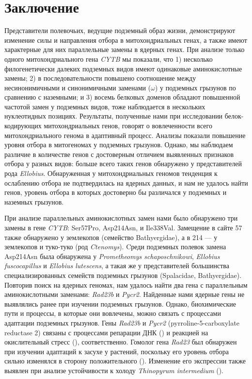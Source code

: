 
\chapter{Заключение} 

Представители полевочьих, ведущие подземный образ жизни, демонстрируют изменение силы и направления отбора в митохондриальных генах, а также имеют характерные для них параллельные замены в ядерных генах. При анализе только одного митохондриального гена \textit{CYTB} мы показали, что 1) несколько филогенетически далеких подземных видов имеют одинаковые аминокислотные замены; 2) в последовательности повышено соотношение между несинонимичными и синонимичными заменами ($\omega$) у  подземных грызунов по сравнению с наземными; и 3) восемь белковых доменов обладают повышенной частотой замен у подземных видов, тоже наблюдается в нескольких нуклеотидных позициях. Результаты, полученные нами при исследовании белок-кодирующих митохондриальных генов, говорят о вовлеченности всего митохондриального генома в адаптивный процесс. Анализы показали повышение уровня отбора в митогеномах у подземных грызунов. Однако, мы наблюдаем различие в количестве генов с достоверным отличием выявленных признаков отбора у разных видов: больше всего таких генов обнаружено у представителей рода \textit{Ellobius}. Обнаруженная у митохондриальных геномов тенденция к ослаблению отбора не подтвердилась на ядерных данных, и нам не удалось найти генов, уровень отбора в которых достоверно бы различался у подземных и наземных грызунов. 

При анализе параллельных аминокислотных замен нами было обнаружено три замены в гене \textit{CYTB}: Ser57Pro, Asp214Asn, и Ile338Val. Замещение в сайте 57 также обнаружено у землекопов (семейство Bathyergidae), а в 214 — у землекопов и туко-туко (род \textit{Ctenomys}). Cреди подземных полевок замена Asp214Asn была обнаружена у \textit{Prometheomys schaposchnikowi}, \textit{Ellobius fuscocapillus} и \textit{Ellobius lutescens}, а такая же у представителей большинства специализированных семейств подземных грызунов (Spalacidae, Bathyergidae). Повторив поиск на ядерных геномах, нам удалось найти два гена с параллельным аминокислотными заменами: \textit{Rad23b} и \textit{Pycr2}. Найденные нами ядерные гены не выявлялись ранее при изучении подземных грызунов. Однако, биохимические пути и процессы, в которые они вовлечены, можно связать с процессами адаптации подземных грызунов. Гены \textit{Rad23b} и \textit{Pycr2} (pyrroline-5-carboxylate reductase 2) связаны с процессами репарации ДНК (\cite{Pohjoismaki2012}) и реакцией на окислительный стресс (\cite{Kuo2015}), соответственно. Гомолог гена \textit{Rad23} был обнаружен при изучении адаптаций к засухе у растений, поскольку его уровень отбора сильно изменялся в сторону положительного (\cite{Zhang2013b}). Изменение его экспрессии также выявлен при анализе устойчивости к холоду \textit{Thinopyrum intermedium} (\cite{Jaikumar2020}). 

